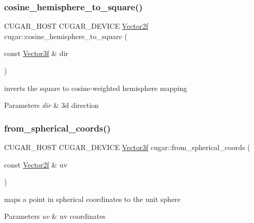 \subsubsection{\texorpdfstring{cosine\+\_\+hemisphere\+\_\+to\+\_\+square()}{cosine\_hemisphere\_to\_square()}}
{\footnotesize\ttfamily C\+U\+G\+A\+R\+\_\+\+H\+O\+ST C\+U\+G\+A\+R\+\_\+\+D\+E\+V\+I\+CE \hyperlink{structcugar_1_1_vector}{Vector2f} cugar\+::cosine\+\_\+hemisphere\+\_\+to\+\_\+square (\begin{DoxyParamCaption}\item[{const \hyperlink{structcugar_1_1_vector}{Vector3f} \&}]{dir }\end{DoxyParamCaption})\hspace{0.3cm}{\ttfamily [inline]}}

inverts the square to cosine-\/weighted hemisphere mapping


\begin{DoxyParams}{Parameters}
{\em dir} & 3d direction \\
\hline
\end{DoxyParams}
\mbox{\label{group__spherical__mappings_gaa4a68b633ea01fccb331d1a47a8ca8d4}} 
\subsubsection{\texorpdfstring{from\+\_\+spherical\+\_\+coords()}{from\_spherical\_coords()}}
{\footnotesize\ttfamily C\+U\+G\+A\+R\+\_\+\+H\+O\+ST C\+U\+G\+A\+R\+\_\+\+D\+E\+V\+I\+CE \hyperlink{structcugar_1_1_vector}{Vector3f} cugar\+::from\+\_\+spherical\+\_\+coords (\begin{DoxyParamCaption}\item[{const \hyperlink{structcugar_1_1_vector}{Vector2f} \&}]{uv }\end{DoxyParamCaption})\hspace{0.3cm}{\ttfamily [inline]}}

maps a point in spherical coordinates to the unit sphere


\begin{DoxyParams}{Parameters}
{\em uv} & uv coordinates \\
\hline
\end{DoxyParams}
\mbox{\label{group__spherical__mappings_ga8acf5ad9380c558633e1aee500d87089}} 
